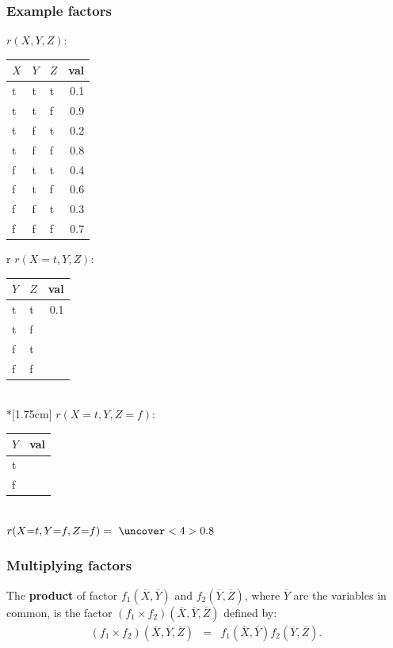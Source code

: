 \documentclass[12pt]{beamer} %
\begin{document}
  \begin{frame}
  \frametitle{Example factors}
  $r(X,Y,Z)$:\begin{tabular}{|lll|r|}
  \hline
  $X$ & $Y$ &$Z$ & val\\\hline
  t & t & t & 0.1\\
    t & t & f & 0.9\\
    t & f & t & 0.2\\
    t & f & f & 0.8\\
    f & t & t & 0.4\\
    f & t & f & 0.6\\
    f & f & t & 0.3\\
    f & f & f & 0.7\\\hline
    \end{tabular}
    \begin{tabular}{r}
    $r(X{=}t,Y,Z)$:\begin{tabular}{|ll|r|}
    \hline
    $Y$ &$Z$ & val\\\hline
    t & t & 0.1\\
      t & f & \uncover<2>{0.9}\\
      f & t &  \uncover<2>{0.2}\\
      f & f &  \uncover<2>{0.8}\\
      \hline
      \end{tabular}\\*[1.75cm]
      \pause
      $r(X{=}t,Y,Z{=}f)$:\pause\begin{tabular}{|l|r|}
      \hline
      $Y$ & val\\\hline
      t &  \uncover<4>{0.9}\\
        f &  \uncover<4>{0.8}\\\hline
        \end{tabular}\\
          $r(X{=}t,Y{=}f,Z{=}f)=\ \uncover<4>{0.8}$
          \end{tabular}


          \end{frame}


          \begin{frame}
          \frametitle{Multiplying factors}
          The  \textbf{product} of factor $f_1(\overline{X},\overline{Y})$ and
          $f_2(\overline{Y},\overline{Z})$, where $\overline{Y}$ are the
          variables in common, is the factor $(f_1 \times
              f_2)(\overline{X},\overline{Y},\overline{Z})$ defined by:
          \begin{eqnarray*}
            (f_1 \times f_2)(\overline{X},\overline{Y},\overline{Z}) %
              &=&
              f_1(\overline{X},\overline{Y}) f_2(\overline{Y},\overline{Z}).
              \end{eqnarray*}

              \end{frame}
\end{document}
